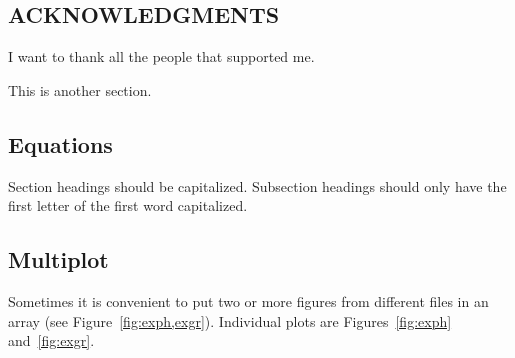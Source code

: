 \subsection*{ACKNOWLEDGMENTS}

\begin{summaryenv}
  I want to thank all the people that supported me.
\end{summaryenv}

\begin{summaryenv}
  This is another section.
\end{summaryenv}

\subsection*{Equations}

\begin{summaryenv}
  Section headings should be capitalized. Subsection headings should
  only have the first letter of the first word capitalized.
\end{summaryenv}

\subsection*{Multiplot}

\begin{summaryenv}
  Sometimes it is convenient to put two or more figures from different
  files in an array (see Figure~\ref{fig:exph,exgr}). Individual plots
  are Figures~\ref{fig:exph} and~\ref{fig:exgr}.
\end{summaryenv}
